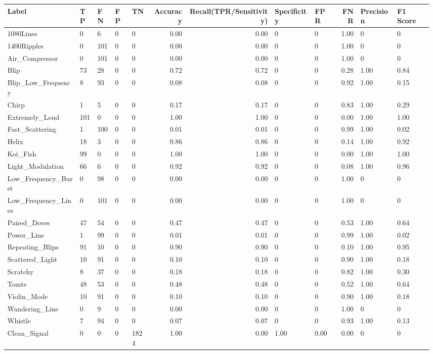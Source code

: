 \begin{tabular}{lllllrrllrll}
\toprule
Label & TP & FN & FP & TN & Accuracy & Recall(TPR/Sensitivity) & Specificity & FPR & FNR & Precision & F1 Score \\
\midrule
1080Lines & 0 & 6 & 0 & 0 & 0.00 & 0.00 & 0 & 0 & 1.00 & 0 & 0 \\
1400Ripples & 0 & 101 & 0 & 0 & 0.00 & 0.00 & 0 & 0 & 1.00 & 0 & 0 \\
Air\_Compressor & 0 & 101 & 0 & 0 & 0.00 & 0.00 & 0 & 0 & 1.00 & 0 & 0 \\
Blip & 73 & 28 & 0 & 0 & 0.72 & 0.72 & 0 & 0 & 0.28 & 1.00 & 0.84 \\
Blip\_Low\_Frequency & 8 & 93 & 0 & 0 & 0.08 & 0.08 & 0 & 0 & 0.92 & 1.00 & 0.15 \\
Chirp & 1 & 5 & 0 & 0 & 0.17 & 0.17 & 0 & 0 & 0.83 & 1.00 & 0.29 \\
Extremely\_Loud & 101 & 0 & 0 & 0 & 1.00 & 1.00 & 0 & 0 & 0.00 & 1.00 & 1.00 \\
Fast\_Scattering & 1 & 100 & 0 & 0 & 0.01 & 0.01 & 0 & 0 & 0.99 & 1.00 & 0.02 \\
Helix & 18 & 3 & 0 & 0 & 0.86 & 0.86 & 0 & 0 & 0.14 & 1.00 & 0.92 \\
Koi\_Fish & 99 & 0 & 0 & 0 & 1.00 & 1.00 & 0 & 0 & 0.00 & 1.00 & 1.00 \\
Light\_Modulation & 66 & 6 & 0 & 0 & 0.92 & 0.92 & 0 & 0 & 0.08 & 1.00 & 0.96 \\
Low\_Frequency\_Burst & 0 & 98 & 0 & 0 & 0.00 & 0.00 & 0 & 0 & 1.00 & 0 & 0 \\
Low\_Frequency\_Lines & 0 & 101 & 0 & 0 & 0.00 & 0.00 & 0 & 0 & 1.00 & 0 & 0 \\
Paired\_Doves & 47 & 54 & 0 & 0 & 0.47 & 0.47 & 0 & 0 & 0.53 & 1.00 & 0.64 \\
Power\_Line & 1 & 99 & 0 & 0 & 0.01 & 0.01 & 0 & 0 & 0.99 & 1.00 & 0.02 \\
Repeating\_Blips & 91 & 10 & 0 & 0 & 0.90 & 0.90 & 0 & 0 & 0.10 & 1.00 & 0.95 \\
Scattered\_Light & 10 & 91 & 0 & 0 & 0.10 & 0.10 & 0 & 0 & 0.90 & 1.00 & 0.18 \\
Scratchy & 8 & 37 & 0 & 0 & 0.18 & 0.18 & 0 & 0 & 0.82 & 1.00 & 0.30 \\
Tomte & 48 & 53 & 0 & 0 & 0.48 & 0.48 & 0 & 0 & 0.52 & 1.00 & 0.64 \\
Violin\_Mode & 10 & 91 & 0 & 0 & 0.10 & 0.10 & 0 & 0 & 0.90 & 1.00 & 0.18 \\
Wandering\_Line & 0 & 9 & 0 & 0 & 0.00 & 0.00 & 0 & 0 & 1.00 & 0 & 0 \\
Whistle & 7 & 94 & 0 & 0 & 0.07 & 0.07 & 0 & 0 & 0.93 & 1.00 & 0.13 \\
Clean\_Signal & 0 & 0 & 0 & 1824 & 1.00 & 0.00 & 1.00 & 0.00 & 0.00 & 0 & 0 \\
\bottomrule
\end{tabular}
